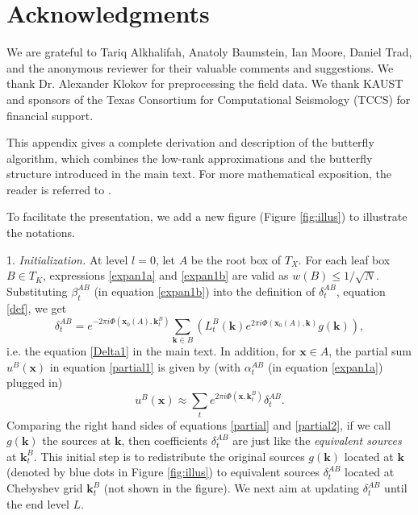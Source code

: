 

\section{Acknowledgments}

We are grateful to Tariq Alkhalifah, Anatoly Baumstein, Ian Moore, Daniel Trad, and the anonymous reviewer for their valuable comments and suggestions. We thank Dr. Alexander Klokov for preprocessing the field data. We thank KAUST and sponsors of the Texas Consortium for Computational Seismology (TCCS) for financial support. 





This appendix gives a complete derivation and description of the butterfly algorithm, which combines the low-rank approximations and the butterfly structure introduced in the main text. For more mathematical exposition, the reader is referred to \cite{CDY09}.

To facilitate the presentation, we add a new figure (Figure \ref{fig:illus}) to illustrate the notations.

1. {\it Initialization.} At level $l=0$, let $A$ be the root box of $T_X$. For each leaf box $B\in T_K$, expressions \ref{expan1a} and \ref{expan1b} are valid as $w(B)\leq 1/\sqrt{N}$. Substituting $\beta_t^{AB}$ (in equation \ref{expan1b}) into the definition of $\delta_t^{AB}$, equation \ref{def}, we get
\begin{equation} \label{delta1}
\delta_t^{AB}=e^{-2\pi i
  \Phi(\mathbf{x}_0(A),\mathbf{k}_t^B)}\sum_{\mathbf{k}\in B}\left(
  L_t^B(\mathbf{k}) e^{2\pi i \Phi(\mathbf{x}_0(A),\mathbf{k})}g(\mathbf{k}) \right),
\end{equation}
i.e. the equation \ref{Delta1} in the main text. In addition, for $\mathbf{x}\in A$, the partial sum $u^B(\mathbf{x})$ in equation \ref{partial1} is given by (with $\alpha_t^{AB}$ (in equation \ref{expan1a}) plugged in)
\begin{equation} \label{partial2}
u^{B}(\mathbf{x}) \approx
\sum_t e^{2\pi i
  \Phi(\mathbf{x},\mathbf{k}_t^B)}\delta_t^{AB}.
\end{equation}
Comparing the right hand sides of equations \ref{partial} and \ref{partial2}, if we call $g(\mathbf{k})$ the sources at $\mathbf{k}$, then coefficients $\delta_t^{AB}$ are just like the {\it equivalent sources} at $\mathbf{k}_t^B$. This initial step is to redistribute the original sources $g(\mathbf{k})$ located at $\mathbf{k}$ (denoted by blue dots in Figure \ref{fig:illus}) to equivalent sources $\delta^{AB}_t$ located at Chebyshev grid $\mathbf{k}_t^B$ (not shown in the figure). We next aim at updating $\delta_t^{AB}$ until the end level $L$.

